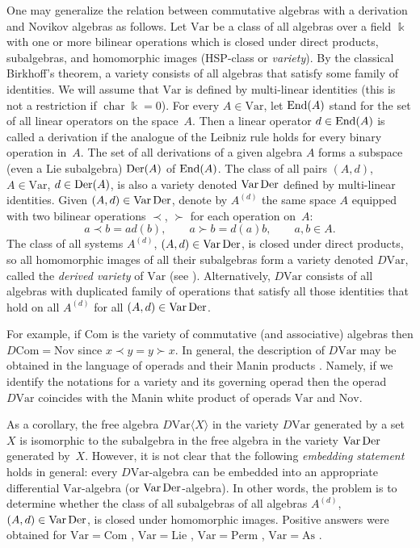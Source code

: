 \documentclass[pdftex]{sigma}
\numberwithin{equation}{section}
\def\Var{\mathrm{Var}}
\def\Nov{\mathrm{Nov}}
\def\Com{\mathrm{Com}}
\def\As{\mathrm{As}}
\def\Lie{\mathrm{Lie}}
\def\Perm{\mathrm{Perm}}
\def\Der {\mathop {\fam 0 Der}\nolimits}
\def\End {\mathop {\fam 0 End}\nolimits}
\begin{document}
One may generalize the relation between commutative algebras with a derivation and Novikov algebras as follows.
Let $\Var$ be a class of all algebras over a field $\Bbbk $ with one or more bilinear operations which is closed under direct products, subalgebras, and homomorphic images (HSP-class or {\em variety}).
By the classical Birkhoff's theorem, a variety consists of all algebras
that satisfy some family of identities.
We will assume that $\Var $ is defined by multi-linear identities (this is not a restriction if $\operatorname{char}\Bbbk =0$).
For every $A\in \Var $, let $\End(A)$ stand for the set
of all linear operators on the space~$A$.
Then a linear operator $d\in \End(A)$
is called a derivation if the analogue of the Leibniz rule
holds for every binary operation in~$A$.
The set of all derivations of a given algebra $A$ forms a subspace (even a Lie subalgebra) $\Der(A)$ of $\End(A)$.
The class of all pairs $(A,d)$, $A\in \Var$, $d\in \Der(A)$,
is also a variety denoted $\Var\Der$ defined by multi-linear identities.
Given $(A,d)\in \Var\Der$, denote by
$A^{(d)}$ the same space $A$ equipped with two bilinear operations
$\prec$, $\succ $ for each operation on~$A$:
\[
a\prec b = ad(b),\qquad a\succ b = d(a)b, \qquad a,b\in A.
\]
The class of all systems $A^{(d)}$, $(A,d)\in \Var\Der$,
is closed under direct products, so all homomorphic images of
all their subalgebras form a variety denoted $D\Var$,
called the {\em derived variety} of $\Var $ (see \cite{KSO2019}).
Alternatively, $D\Var $ consists of all algebras with duplicated family
of operations that satisfy all those identities that hold on all $A^{(d)}$
for all $(A,d)\in \Var\Der$.

For example, if $\Com $ is the variety of commutative (and associative) algebras then $D\Com = \Nov$ since
$x\prec y = y\succ x$. In general, the description of
$D\Var $ may be obtained in the language of operads and their
Manin products \cite{KSO2019}. Namely, if we identify the notations
for a variety and its governing operad \cite{GK-1994}
then the operad
$D\Var $ coincides with the Manin white product of operads
$\Var $ and $\Nov $.

As a corollary, the free algebra $D\Var \langle X\rangle $
in the variety $D\Var $ generated by a set $X$
is isomorphic to
the subalgebra in the free algebra in the variety
$\Var\Der$ generated by~$X$. However, it is not clear that
the following {\em embedding statement} holds in general:
 every
$D\Var$-algebra can be embedded into an appropriate
differential $\Var$-algebra (or $\Var\Der$-algebra).
In other words, the problem is to determine whether the
class of all subalgebras of all algebras $A^{(d)}$,
$(A,d)\in \Var\Der$,
is closed under homomorphic images.
Positive answers were obtained
for $\Var =\Com $ \cite{BCZ-2017}, $\Var=\Lie$ \cite{KSO2019}, $\Var=\Perm$ \cite{KS2022}, $\Var=\As$ \cite{SK-2022}.
\end{document}
